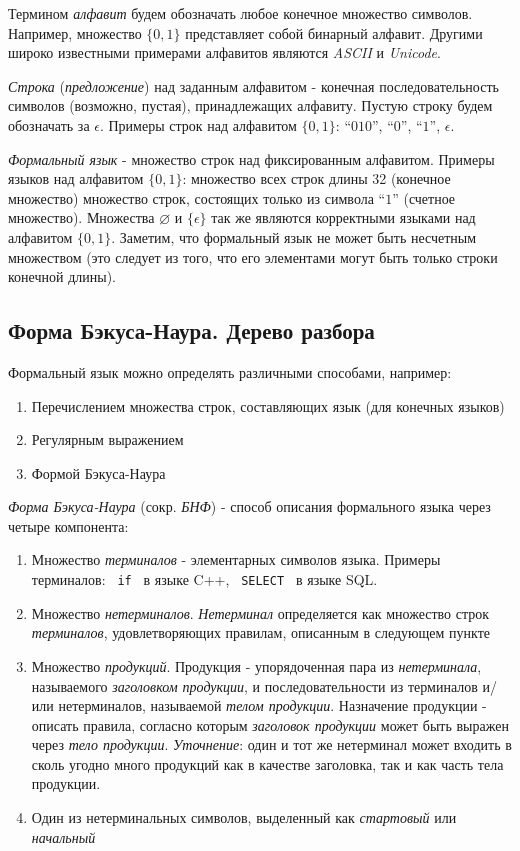Термином \textit{алфавит} будем обозначать любое конечное множество символов. Например, множество $\{0, 1\}$ представляет собой бинарный алфавит. Другими широко известными примерами алфавитов являются \textit{ASCII} и \textit{Unicode}. 

\textit{Строка} (\textit{предложение}) над заданным алфавитом - конечная последовательность символов (возможно, пустая), принадлежащих алфавиту. Пустую строку будем обозначать за $\epsilon$. Примеры строк над алфавитом $\{0, 1\}$: \enquote{$010$}, \enquote{$0$}, \enquote{$1$}, $\epsilon$.

\textit{Формальный язык} - множество строк над фиксированным алфавитом. Примеры языков над алфавитом $\{0, 1\}$: множество всех строк длины 32 (конечное множество) множество строк, состоящих только из символа \enquote{$1$} (счетное множество). Множества $\varnothing$ и $\{\epsilon\}$ так же являются корректными языками над алфавитом $\{0, 1\}$. Заметим, что формальный язык не может быть несчетным множеством (это следует из того, что его элементами могут быть только строки конечной длины).

\subsection{Форма Бэкуса-Наура. Дерево разбора} \label{lit:bnf}

Формальный язык можно определять различными способами, например:
\begin{enumerate}
    \item Перечислением множества строк, составляющих язык (для конечных языков)
    \item Регулярным выражением
    \item Формой Бэкуса-Наура
\end{enumerate}

\textit{Форма Бэкуса-Наура} (сокр. \textit{БНФ}) - способ описания формального языка через четыре компонента:
\begin{enumerate}
    \item Множество \textit{терминалов} - элементарных символов языка. Примеры терминалов: \texttt{ if } в языке C++, \texttt{ SELECT } в языке SQL.
    \item Множество \textit{нетерминалов}. \textit{Нетерминал} определяется как множество строк \textit{терминалов}, удовлетворяющих правилам, описанным в следующем пункте
    \item Множество \textit{продукций}. Продукция - упорядоченная пара из \textit{нетерминала}, называемого \textit{заголовком продукции}, и последовательности из терминалов и/или нетерминалов, называемой \textit{телом продукции}. Назначение продукции - описать правила, согласно которым \textit{заголовок продукции} может быть выражен через \textit{тело продукции}. \textit{Уточнение}: один и тот же нетерминал может входить в сколь угодно много продукций как в качестве заголовка, так и как часть тела продукции.
    \item Один из нетерминальных символов, выделенный как \textit{стартовый} или \textit{начальный}
\end{enumerate}

